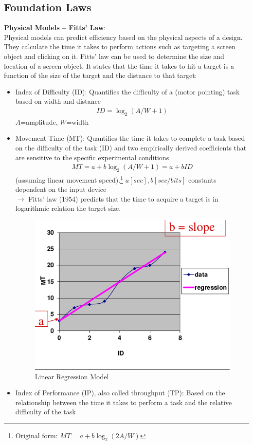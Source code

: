 \subsection{Foundation Laws}
\textbf{Physical Models -- Fitts' Law}:\\
Physical models can predict efficiency based on the physical aspects of a design. They calculate the time it takes to perform actions such as targeting a screen object and clicking on it.
Fitts' law can be used to determine the size and location of a screen object. It states that the time it takes to hit a target is a function of the size of the target and the distance to that target:
\begin{itemize}
\item Index of Difficulty (ID): Quantifies the difficulty of a (motor pointing) task based on width and distance
\begin{align*}
ID = \log_2(A / W+1)
\end{align*}
$A$=amplitude, $W$=width
\item Movement Time (MT): Quantifies the time it takes to complete a task based on the difficulty of the task (ID) and two empirically derived coefficients that are sensitive to the specific experimental conditions\\
\begin{align*}
MT = a + b \log_2(A / W+1) = a + b ID
\end{align*}(assuming linear movement speed).\footnote{Original form: $MT = a + b \log_2(2A / W)$}
$a \left[sec\right], b\left[sec/bits\right]$ constants dependent on the input device\\
$\rightarrow$ Fitts' law (1954) predicts that the time to acquire a target is in logarithmic relation the target size.\\
\begin{figure}[h!]
	\centering
	\includegraphics[width=.5\textwidth]{img/ch05_fitt.png}
	\caption{Linear Regression Model}
	\label{fitt}
\end{figure} 
\item Index of Performance (IP), also called throughput (TP): Based on the relationship between the time it takes to perform a task and the relative difficulty of the task
\end{itemize}
